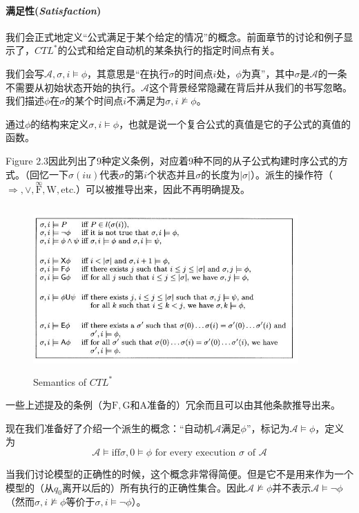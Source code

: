 \documentclass{book}
\begin{document}
    \paragraph{满足性({\itshape Satisfaction})}我们会正式地定义“公式满足于某个给定的情况”的概念。前面章节的讨论和例子显示了，$CTL^*$的公式和给定自动机的某条执行的指定时间点有关。

    我们会写$\mathcal{A}, \sigma, i \models \phi $，其意思是“在执行$\sigma$的时间点$i$处，$\phi$为真”，其中$\sigma$是$\mathcal{A}$的一条不需要从初始状态开始的执行。$\mathcal{A}$这个背景经常隐藏在背后并从我们的书写忽略。我们描述$\phi$在$\sigma$的某个时间点$i$不满足为$\sigma, i\nvDash \phi$。

    通过$\phi$的结构来定义$\sigma, i \models \phi$，也就是说一个复合公式的真值是它的子公式的真值的函数。

    Figure 2.3因此列出了9种定义条例，对应着9种不同的从子公式构建时序公式的方式。（回忆一下$\sigma(iu)$代表$\sigma$的第$i$个状态并且$\sigma$的长度为$|\sigma|$）。派生的操作符（$\Rightarrow, \vee, \overset{\infty}{\mathrm{F}}, \mathrm{W},$etc.）可以被推导出来，因此不再明确提及。
    \begin{figure}
        \centering
        \includegraphics[width=4.0in,height=2.5in]{2_3.jpg}
    \caption{Semantics of $CTL^*$}
    \end{figure}

    一些上述提及的条例（为$\mathrm{F},\mathrm{G}$和$\mathrm{A}$准备的）冗余而且可以由其他条款推导出来。

    现在我们准备好了介绍一个派生的概念：“自动机$\mathcal{A}满足\phi$”，标记为$\mathcal{A}\models\phi$，定义为
    \begin{equation}\label{D1}
      \mathcal{A}\models \text{iff} \sigma,0\models\phi \text{ for every execution } \sigma \text{ of } \mathcal{A}
    \end{equation}

    当我们讨论模型的正确性的时候，这个概念非常得简便。但是它不是用来作为一个模型的（从$q_0$离开以后的）所有执行的正确性集合。因此$\mathcal{A}\nvDash\phi$并不表示$\mathcal{A} \models \neg\phi$（然而$\sigma,i \nvDash \phi$等价于$\sigma,i \models \neg \phi$）。
\end{document}
